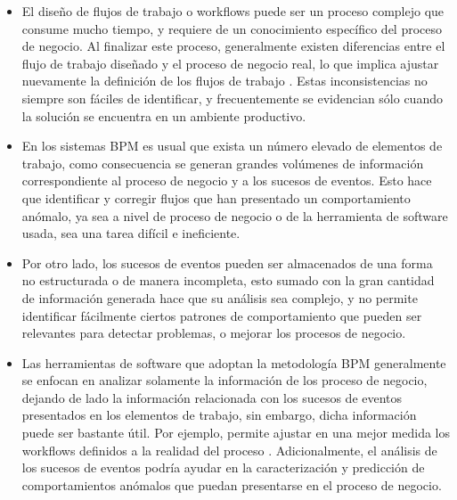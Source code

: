 \begin{itemize}
    \item El diseño de flujos de trabajo o workflows puede ser un proceso complejo que consume mucho tiempo, y requiere de un conocimiento específico del proceso de negocio. Al finalizar este proceso, generalmente existen diferencias entre el flujo de trabajo diseñado y el proceso de negocio real, lo que implica ajustar nuevamente la definición de los flujos de trabajo \cite{VanDerAalst2004_2}. Estas inconsistencias no siempre son fáciles de identificar, y frecuentemente se evidencian sólo cuando la solución se encuentra en un ambiente productivo.
    
    \item En los sistemas BPM es usual que exista un número elevado de elementos de trabajo, como consecuencia se generan grandes volúmenes de información correspondiente al proceso de negocio y a los sucesos de eventos. Esto hace que identificar y corregir flujos que han presentado un comportamiento anómalo, ya sea a nivel de proceso de negocio o de la herramienta de software usada, sea una tarea difícil e ineficiente.
    
    \item Por otro lado, los sucesos de eventos pueden ser almacenados de una forma no estructurada o de manera incompleta, esto sumado con la gran cantidad de información generada hace que su análisis sea complejo, y no permite identificar fácilmente ciertos patrones de comportamiento que pueden ser relevantes para detectar problemas, o mejorar los procesos de negocio.
    
    \item Las herramientas de software que adoptan la metodología BPM generalmente se enfocan en analizar solamente la información de los proceso de negocio, dejando de lado la información relacionada con los sucesos de eventos presentados en los elementos de trabajo, sin embargo, dicha información puede ser bastante útil. Por ejemplo, permite ajustar en una mejor medida los workflows definidos a la realidad del proceso \cite{VanDerAalst2004_2}. Adicionalmente, el análisis de los sucesos de eventos podría ayudar en la caracterización y predicción de comportamientos anómalos que puedan presentarse en el proceso de negocio.
    
\end{itemize}

